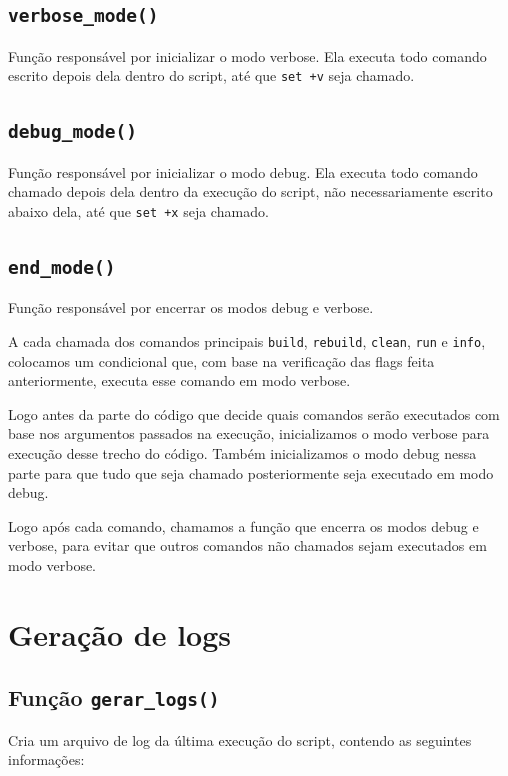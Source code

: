 \documentclass[a4paper]{article}
\begin{document}
\subsection*{\texttt{verbose\_mode()}}

Função responsável por inicializar o modo verbose. Ela executa todo comando escrito depois dela dentro do script, até que \texttt{set +v} seja chamado.

\subsection*{\texttt{debug\_mode()}}

Função responsável por inicializar o modo debug. Ela executa todo comando chamado depois dela dentro da execução do script, não necessariamente escrito abaixo dela, até que \texttt{set +x} seja chamado.

\subsection*{\texttt{end\_mode()}}

Função responsável por encerrar os modos debug e verbose.

A cada chamada dos comandos principais \texttt{build}, \texttt{rebuild}, \texttt{clean}, \texttt{run} e \texttt{info}, colocamos um condicional que, com base na verificação das flags feita anteriormente, executa esse comando em modo verbose.

Logo antes da parte do código que decide quais comandos serão executados com base nos argumentos passados na execução, inicializamos o modo verbose para execução desse trecho do código. Também inicializamos o modo debug nessa parte para que tudo que seja chamado posteriormente seja executado em modo debug.

Logo após cada comando, chamamos a função que encerra os modos debug e verbose, para evitar que outros comandos não chamados sejam executados em modo verbose.

\section{Geração de logs}

\subsection*{Função \texttt{gerar\_logs()}}

Cria um arquivo de log da última execução do script, contendo as seguintes informações:
\end{document}
